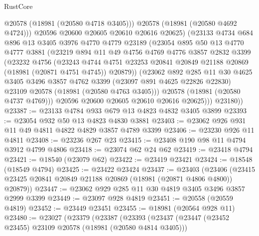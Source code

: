 \begin{lexlean}{RustCore}
\begin{coremodule}
                @20578
                (@18981 (@20580 @4718 @3405)))
              @20578
              (@18981 (@20580 @4692 @4724)))
            @20596
            @20600
            @20605
            @20610
            @20616
            @20625)
          (@23133
            @4734
            @684
            @896
            @13
            @3405
            @3976
            @4770
            @4779
            @23189
            (@23054
              @895
              @50
              @13
              @4770
              @4777
              @3881
              (@23219
                @894
                @11
                @49
                @4756
                @4769
                @4776
                @3857
                @2832
                @3399
                (@23232
                  @4756
                  (@23243
                    @4744
                    @4751
                    @23253
                    @20841
                    @20849
                    @21188
                    @20869
                    (@18981 (@20871 @4751 @4745))
                    @20879))
                (@23062
                  @892
                  @285
                  @11
                  @30
                  @4625
                  @3405
                  @3496
                  @3857
                  @4762
                  @3399
                  (@23097 @891 @4625 @22826 @22830)
                  @23109
                  @20578
                  (@18981 (@20580 @4763 @3405)))
                @20578
                (@18981 (@20580 @4737 @4769)))
              @20596
              @20600
              @20605
              @20610
              @20616
              @20625)))
        @23180))
@23387 := @23133 @4784 @933 @679 @13 @4823 @4832 @3405 @3899
@23393 := @23054 @932 @50 @13 @4823 @4830 @3881
@23403 := @23062 @926 @931 @11 @49 @4811 @4822 @4829 @3857 @4789 @3399
@23406 := @23230 @926 @11 @4811
@23408 := @23236 @267 @23
@23415 := @23408 @190 @98 @11 @4794 @3912 @4799 @4806
@23418 := @23074 @62 @24 @62
@23419 := @23418 @4794
@23421 := @18540 (@23079 @62)
@23422 := @23419 @23421
@23424 := @18548 (@18549 @4794)
@23425 := @23422 @23424
@23437 := @23403
    (@23406 (@23415 @23425 @20841 @20849 @21188 @20869 (@18981 (@20871 @4806 @4800)) @20879))
@23447 := @23062 @929 @285 @11 @30 @4819 @3405 @3496 @3857 @2999 @3399
@23449 := @23097 @928 @4819
@23451 := @20558 (@20559 @4819)
@23452 := @23449 @23451
@23455 := @18981 (@20564 @928 @11)
@23480 := @23027
    (@23379
      (@23387
        (@23393
          (@23437
            (@23447 (@23452 @23455) @23109 @20578 (@18981 (@20580 @4814 @3405)))

\end{coremodule}
\end{lexlean}
